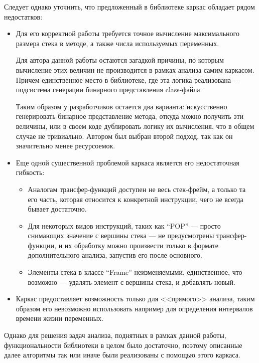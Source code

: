 Следует однако уточнить, что предложенный в библиотеке каркас обладает рядом недостатков:
\begin{itemize}
    \item Для его корректной работы требуется точное вычисление максимального размера стека
    в методе, а также числа используемых переменных.

    Для автора данной работы остаются загадкой причины, по которым вычисление этих величин
    не производится в рамках анализа самим каркасом.
    Причем единственное место в библиотеке, где эта логика реализована --- подсистема генерации
    бинарного представления class-файла.

    Таким образом у разработчиков остается два варианта: искусственно генерировать бинарное
    представление метода, откуда можно получить эти величины, или в своем коде дублировать логику
    их вычисления, что в общем случае не тривиально.
    Автором был выбран второй подход, так как он значительно менее ресурсоемок.

    \item Еще одной существенной проблемой каркаса является его недостаточная гибкость:
    \begin{itemize}
        \item Аналогам трансфер-функций доступен не весь стек-фрейм, а только та его часть,
        которая относится к конкретной инструкции, чего не всегда бывает достаточно.

        \item Для некоторых видов инструкций, таких как ``POP'' --- просто снимающих значение
        с вершины стека --- не предусмотрены трансфер-функции, и их обработку можно произвести
        только в формате дополнительного анализа, запустив его после основного.

        \item Элементы стека в классе ``Frame'' неизменяемыми, единственное, что возможно ---
        удалять элемент с вершины стека, и добавлять новый.
    \end{itemize}

    \item Каркас предоставляет возможность только для <<прямого>> анализа, таким образом его
    невозможно использовать например для определения интервалов времени жизни переменных.
\end{itemize}

Однако для решения задач анализа, поднятных в рамках данной работы, функциональности библиотеки
в целом было достаточно, поэтому описанные далее алгоритмы так или иначе были реализованы
с помощью этого каркаса.

